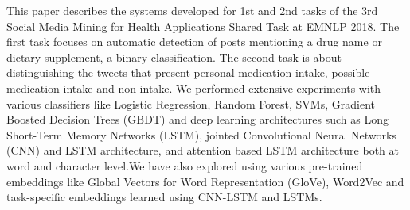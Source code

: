 This paper describes the systems developed for 1st and 2nd tasks of the 3rd Social Media Mining for Health Applications Shared Task at EMNLP 2018. The first task focuses on automatic detection of posts mentioning a drug name or dietary supplement, a binary classification. The second task is about distinguishing the tweets that present personal medication intake, possible medication intake and non-intake. We performed extensive experiments with various classifiers like Logistic Regression, Random Forest, SVMs, Gradient Boosted Decision Trees (GBDT) and deep learning architectures such as Long Short-Term Memory Networks (LSTM), jointed Convolutional Neural Networks (CNN) and LSTM architecture, and attention based LSTM architecture both at word and character level.We have also explored using various pre-trained embeddings like Global Vectors for Word Representation (GloVe), Word2Vec and task-specific embeddings learned using CNN-LSTM and LSTMs.
